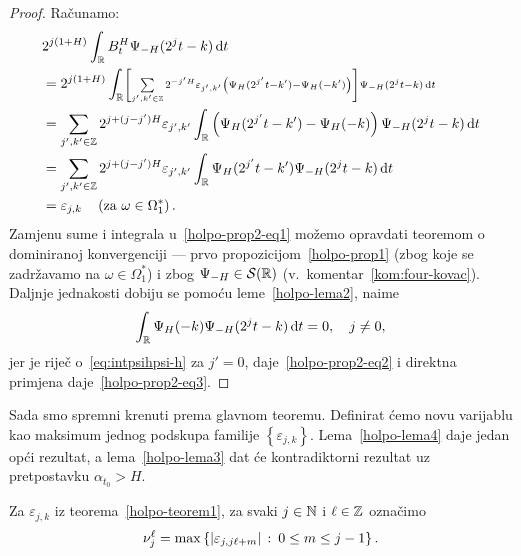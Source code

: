 \documentclass[main.tex]{subfiles}
\begin{document}
\newcommand{\grn}{_\R}
\begin{proof}
	Računamo:
	\begin{align}
		 & 2^{j(1+H)}\int\grn B^H_t\Psi_{-H}(2^jt-k) \D t                                                                                                                                                     \\
		 & = 2^{j(1+H)}\int\grn  \scriptstyle \left[ \sum\limits_{j',k'\in\Z} 2^{-j'H}\varepsilon_{j',k'}\left( \Psi_H(2^{j'}t-k')-\Psi_H(-k') \right) \right] \Psi_{-H}(2^jt-k) \D t \label{holpo-prop2-eq1} \\
		 & = \sum_{j',k'\in\Z} 2^{j+(j-j')H}\varepsilon_{j',k'}
		\int\grn \left( \Psi_H(2^{j'}t-k')-\Psi_H(-k) \right)\Psi_{-H}(2^jt-k) \D t                                                                                                                           \\
		 & = \sum_{j',k'\in\Z} 2^{j+(j-j')H}\varepsilon_{j',k'}
		\int\grn \Psi_H(2^{j'}t-k')\Psi_{-H}(2^jt-k) \D t \label{holpo-prop2-eq2}                                                                                                                             \\
		 & = \varepsilon_{j,k} \quad \left(\text{za } \omega \in \Omega_1^*\right). \label{holpo-prop2-eq3}
	\end{align}
	Zamjenu sume i integrala u~\eqref{holpo-prop2-eq1} možemo opravdati teoremom o
	dominiranoj konvergenciji --- prvo propozicijom~\ref{holpo-prop1}
	(zbog koje se zadržavamo na \( \omega \in \Omega_1^* \)) i zbog \( \Psi_{-H} \in \mathcal S(\mathbb{R}) \)
	(v.~komentar~\ref{kom:four-kovac}). Daljnje jednakosti dobiju se pomoću leme~\ref{holpo-lema2}, naime
	\begin{equation}
		\int\grn \Psi_H(-k)\Psi_{-H}(2^jt-k) \D t = 0, \quad j \neq 0,
	\end{equation}
	jer je riječ o~\eqref{eq:intpsihpsi-h} za \( j'=0 \), daje~\eqref{holpo-prop2-eq2} i direktna primjena daje~\eqref{holpo-prop2-eq3}.
\end{proof}

Sada smo spremni krenuti prema glavnom teoremu.
Definirat ćemo novu varijablu kao maksimum
jednog podskupa familije \( \left\{ \varepsilon_{j,k} \right\} \).
Lema~\ref{holpo-lema4} daje jedan opći rezultat,
a lema~\ref{holpo-lema3} dat će kontradiktorni rezultat
uz pretpostavku \( \alpha_{t_0} > H \).

\begin{definicija}
	Za \( \varepsilon_{j,k} \) iz teorema~\ref{holpo-teorem1}, za svaki \( j \in \mathbb{N} \)
	i \( \ell \in \mathbb{Z} \) označimo
	\begin{equation}
		\nu_j^\ell = \max\left\{ \left| {\varepsilon_{j, j\ell+m}} \right| \, \colon \, 0 \le m \le j-1 \right\}.
	\end{equation}
\end{definicija}
\end{document}
